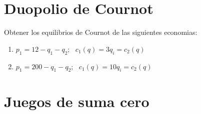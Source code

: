 \documentclass[11pt]{article}
\begin{document}
\begin{flushleft}
\section{Duopolio de Cournot}

\begin{flushleft}
    Obtener los equilibrios de Cournot de las siguientes economias:
    \begin{enumerate}[label=\roman*)]
        \item $p_1=12-q_1-q_2;~~~c_1(q)=3q_i=c_2(q)$
        \item $p_1=200-q_1-q_2;~~~c_1(q)=10q_i=c_2(q)$
    \end{enumerate}
\end{flushleft}

\section{Juegos de suma cero}


\end{flushleft}
\end{document}
